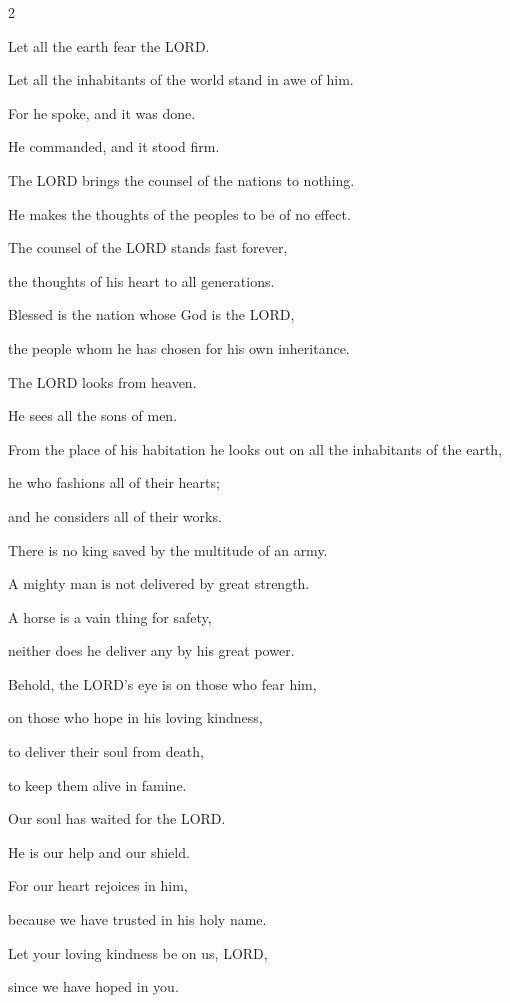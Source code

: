 \begin{multicols}{2}
	
	\myverse{}Let all the earth fear the LORD.
	
	Let all the inhabitants of the world stand in awe of him.
	
	
	\myverse{}For he spoke, and it was done.
	
	He commanded, and it stood firm.
	
	
	\myverse{}The LORD brings the counsel of the nations to nothing.
	
	He makes the thoughts of the peoples to be of no effect.
	
	
	\myverse{}The counsel of the LORD stands fast forever,
	
	the thoughts of his heart to all generations.
	
	
	\myverse{}Blessed is the nation whose God is the LORD,
	
	the people whom he has chosen for his own inheritance.
	
	
	\myverse{}The LORD looks from heaven.
	
	He sees all the sons of men.
	
	
	\myverse{}From the place of his habitation he looks out on all the inhabitants
	of the earth,
	
	
	\myverse{}he who fashions all of their hearts;
	
	and he considers all of their works.
	
	
	\myverse{}There is no king saved by the multitude of an army.
	
	A mighty man is not delivered by great strength.
	
	
	\myverse{}A horse is a vain thing for safety,
	
	neither does he deliver any by his great power.
	
	
	\myverse{}Behold, the LORD’s eye is on those who fear him,
	
	on those who hope in his loving kindness,
	
	
	\myverse{}to deliver their soul from death,
	
	to keep them alive in famine.
	
	
	\myverse{}Our soul has waited for the LORD.
	
	He is our help and our shield.
	
	
	\myverse{}For our heart rejoices in him,
	
	because we have trusted in his holy name.
	
	
	\myverse{}Let your loving kindness be on us, LORD,
	
	since we have hoped in you.
	

\end{multicols}
